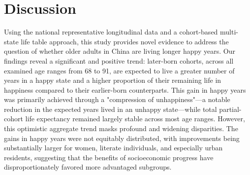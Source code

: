 \documentclass[12pt, a4paper]{article}
\begin{document}
\section{Discussion}

Using the national representative longitudinal data and a cohort-based multi-state life table approach, this study provides novel evidence to address the question of whether older adults in China are living longer happy years. Our findings reveal a significant and positive trend: later-born cohorts, across all examined age ranges from 68 to 91, are expected to live a greater number of years in a happy state and a higher proportion of their remaining life in happiness compared to their earlier-born counterparts. This gain in happy years was primarily achieved through a "compression of unhappiness"—a notable reduction in the expected years lived in an unhappy state—while total partial-cohort life expectancy remained largely stable across most age ranges. However, this optimistic aggregate trend masks profound and widening disparities. The gains in happy years were not equitably distributed, with improvements being substantially larger for women, literate individuals, and especially urban residents, suggesting that the benefits of socioeconomic progress have disproportionately favored more advantaged subgroups.
\end{document}
